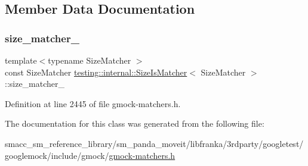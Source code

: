 \subsection{Member Data Documentation}
\mbox{\label{classtesting_1_1internal_1_1SizeIsMatcher_aa5a60a11ee3fb9021024e0306cf2a2a0}} 
\subsubsection{\texorpdfstring{size\+\_\+matcher\+\_\+}{size\_matcher\_}}
{\footnotesize\ttfamily template$<$typename Size\+Matcher $>$ \\
const Size\+Matcher \hyperlink{classtesting_1_1internal_1_1SizeIsMatcher}{testing\+::internal\+::\+Size\+Is\+Matcher}$<$ Size\+Matcher $>$\+::size\+\_\+matcher\+\_\+\hspace{0.3cm}{\ttfamily [private]}}



Definition at line 2445 of file gmock-\/matchers.\+h.



The documentation for this class was generated from the following file\+:\begin{DoxyCompactItemize}
\item 
smacc\+\_\+sm\+\_\+reference\+\_\+library/sm\+\_\+panda\+\_\+moveit/libfranka/3rdparty/googletest/googlemock/include/gmock/\hyperlink{gmock-matchers_8h}{gmock-\/matchers.\+h}\end{DoxyCompactItemize}
